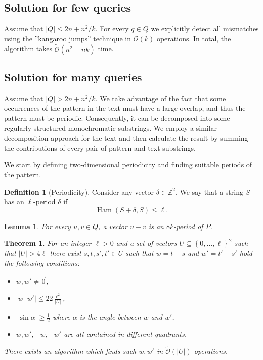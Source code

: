 \documentclass[11pt]{article}
\newcommand{\Z}{\mathbb{Z}}
\renewcommand{\O}{\mathcal{O}}
\newcommand{\tO}{\tilde{\mathcal{O}}}
\newcommand{\set}[1]{\left\lbrace #1 \right\rbrace}
\DeclareMathOperator*{\Ham}{Ham}
\theoremstyle{plain}
\newtheorem{theorem}{Theorem}
\newtheorem{lemma}{Lemma}
\theoremstyle{definition}
\newtheorem{definition}{Definition}
\begin{document}
\subsection{Solution for few queries}
Assume that $|Q| \le 2n + n^2/k$.
For every $q \in Q$ we explicitly detect all mismatches using the ''kangaroo jumps'' technique in $\O(k)$ operations.
In total, the algorithm takes $\tO(n^2 + nk)$ time.


\subsection{Solution for many queries}
Assume that $|Q| > 2n + n^2/k$.
We take advantage of the fact that some occurrences of the pattern in the text must have a large overlap, and thus the pattern must be periodic.
Consequently, it can be decomposed into some regularly structured monochromatic substrings.
We employ a similar decomposition approach for the text and then calculate the result by summing the contributions of every pair of pattern and text substrings.

We start by defining two-dimensional periodicity and finding suitable periods of the pattern.


\begin{definition}[Periodicity]
	Consider any vector $\delta \in \Z^2$.
	We say that a string $S$ has an $\ell$-period $\delta$ if $$ \Ham(S + \delta, S) \le \ell. $$
\end{definition}


\begin{lemma} \label{periodicity_lemma}
	For every $u, v \in Q$, a vector $u - v$ is an $8k$-period of $P$.
\end{lemma}



\begin{theorem}
	\label{get_periods}
	For an integer $\ell > 0$ and a set of vectors $U \subseteq \set{0, \dots, \ell}^2 $ such that $|U| > 4\ell$ there exist $s, t, s', t' \in U$ such that $w = t - s$ and $w' = t' - s'$ hold the following conditions:
	\begin{itemize}
		\item $w, w' \neq \vec{0}$,
		\item $|w||w'| \le 22\frac{\ell^2}{|U|}$,
		\item $|\sin \alpha| \ge \frac{1}{2}$ where $\alpha$ is the angle between $w$ and $w'$,
		\item $w, w', -w, -w'$ are all contained in different quadrants.
	\end{itemize}
	There exists an algorithm which finds such $w, w'$ in $\tO(|U|)$ operations.
\end{theorem}
\end{document}
